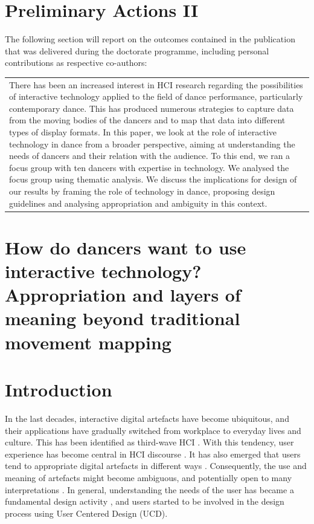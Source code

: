 \section{Preliminary Actions II}
\label{preliminary_actions:modi_ws1}

The following section will report on the outcomes contained in the publication that was delivered during the doctorate programme, including personal contributions as respective co-authors: 


\begin{center}
\begin{tabular}{ p{13cm}}
There has been an increased interest in HCI research regarding the possibilities of interactive technology applied to the field of dance performance, particularly contemporary dance. This has produced numerous strategies to capture data from the moving bodies of the dancers and to map that data into different types of display formats. In this paper, we look at the role of interactive technology in dance from a broader perspective, aiming at understanding the needs of dancers and their relation with the audience. To this end, we ran a focus group with ten dancers with expertise in technology. We analysed the focus group using thematic analysis. We discuss the implications for design of our results by framing the role of technology in dance, proposing design guidelines and analysing appropriation and ambiguity in this context.
\end{tabular}
\end{center}

\section{How do dancers want to use interactive technology? Appropriation and layers of meaning beyond traditional movement mapping}

\section{Introduction}
 
In the last decades, interactive digital artefacts have become ubiquitous, and their applications have gradually switched from workplace to everyday lives and culture. This has been identified as third-wave HCI \cite{bodker2015third}. With this tendency, user experience has become central in HCI discourse \cite{wright2005user}. It has also emerged that users tend to appropriate digital artefacts in different ways \cite{dourish2003appropriation}. Consequently, the use and meaning of artefacts might become ambiguous, and potentially open to many interpretations \cite{gaver2003ambiguity}.
In general, understanding the needs of the user has became a fundamental design activity \cite{bannon2011reimagining}, and users started to be involved in the design process using User Centered Design (UCD).


